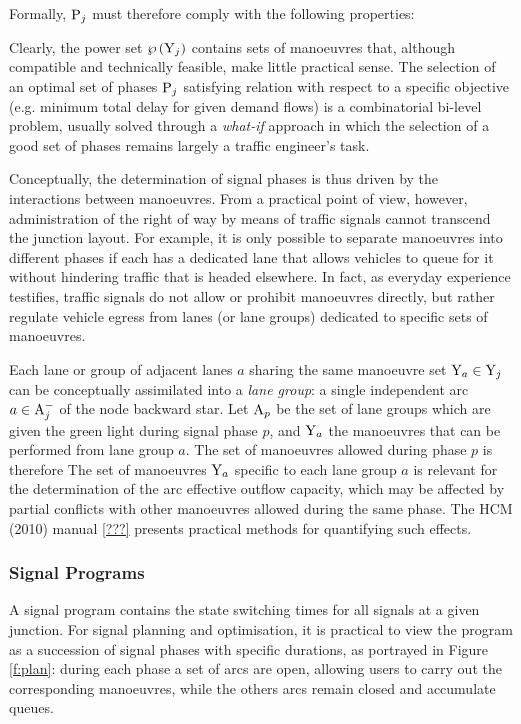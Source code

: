 Formally, $\mathrm{P}_j$ must therefore comply with the following properties:

Clearly, the power set $\wp \left( \mathrm{Y}_j \right)$ contains sets of manoeuvres that, although compatible and technically feasible, make little practical sense.
The selection of an optimal set of phases $\mathrm{P}_j$ satisfying relation  with respect to a specific objective (e.g. minimum total delay for given demand flows) is a combinatorial bi-level problem, usually solved through a \emph{what-if} approach in which the selection of a good set of phases remains largely a traffic engineer's task.

Conceptually, the determination of signal phases is thus driven by the interactions
between manoeuvres. From a practical point of view, however, administration of the right of
way by means of traffic signals cannot transcend the junction layout.
For example, it is only possible to separate manoeuvres into different phases if each has a dedicated lane that allows vehicles to queue for it without hindering traffic that is headed elsewhere. In fact, as everyday experience testifies, traffic signals do not allow or prohibit
manoeuvres directly, but rather regulate vehicle egress from lanes (or lane groups) dedicated
to specific sets of manoeuvres.

Each lane or group of adjacent lanes $a$ sharing the same manoeuvre set $\mathrm{Y}_a \in \mathrm{Y}_j$ can be conceptually assimilated into a \emph{lane group}: a single independent arc $a \in \mathrm{A}_j^-$
of the node backward star.
Let $\mathrm{A}_p$ be the set of lane groups which are given the green light during signal phase $p$,
and $\mathrm{Y}_a$ the manoeuvres that can be performed from lane group $a$.
The set of manoeuvres allowed during phase $p$ is therefore
The set of manoeuvres $\mathrm{Y}_a$ specific to each lane group $a$ is relevant for the determination
of the arc effective outflow capacity, which may be affected by partial conflicts with other
manoeuvres allowed during the same phase. The HCM (2010) manual \ref{???} presents practical
methods for quantifying such effects.

\subsubsection{Signal Programs}
A signal program contains the state switching times for all signals at a given junction.
For signal planning and optimisation, it is practical to view the program as a succession
of signal phases with specific durations, as portrayed in Figure \ref{f:plan}: during each phase a set of arcs are open, allowing users to carry out the corresponding manoeuvres, while the others arcs remain closed and accumulate queues.

